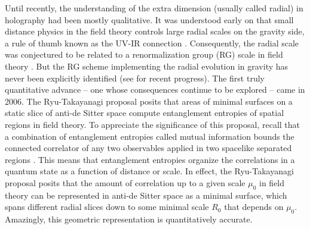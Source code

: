 \documentclass[12pt]{article}
\begin{document}
Until recently, the understanding of the extra dimension (usually called radial) in holography had been mostly qualitative. It was understood early on that small distance physics in the field theory controls large radial scales on the gravity side, a rule of thumb known as the UV-IR connection \cite{uvir}. Consequently, the radial scale was conjectured to be related to a renormalization group (RG) scale in field theory \cite{Akhmedov:1998vf, Balasubramanian:1999jd, deBoer:1999xf}. But the RG scheme implementing the radial evolution in gravity has never been explicitly identified (see \cite{Balasubramanian:2012hb, Jackson:2013eqa} for recent progress). The first truly quantitative advance -- one whose consequences continue to be explored -- came in 2006. The Ryu-Takayanagi proposal \cite{rt1, rt2} posits that areas of minimal surfaces on a static slice of anti-de Sitter space compute entanglement entropies of spatial regions in field theory. To appreciate the significance of this proposal, recall that a combination of entanglement entropies called mutual information bounds the connected correlator of any two observables applied in two spacelike separated regions \cite{entcorr}. This means that entanglement entropies organize the correlations in a quantum state as a function of distance or scale. In effect, the Ryu-Takayanagi proposal posits that the amount of correlation up to a given scale $\mu_0$ in field theory can be represented in anti-de Sitter space as a minimal surface, which spans different radial slices down to some minimal scale $R_0$ that depends on $\mu_0$. Amazingly, this geometric representation is quantitatively accurate.
\end{document}
